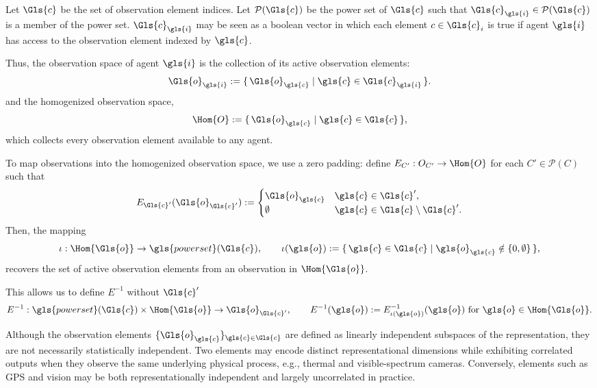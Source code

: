 Let \(\Gls{c}\) be the set of observation element indices.
Let \(\mathcal{P}(\Gls{c})\) be the power set of \(\Gls{c}\)
such that \(\Gls{c}_{\gls{i}} \in \mathcal{P}(\Gls{c})\) is a member of the power set.
\(\Gls{c}_{\gls{i}}\) may be seen as a boolean vector in which each element \(c\in \Gls{c}_i\)
is true if agent \(\gls{i}\) has access to the observation element indexed by \(\gls{c}\).

Thus, the observation space of agent \(\gls{i}\) is the collection of its active
observation elements:
\[
    \Gls{o}_{\gls{i}} := \{\, \Gls{o}_{\gls{c}} \mid \gls{c} \in \Gls{c}_{\gls{i}} \,\}.
\]
and the homogenized observation space,
\[
    \Hom{O}:= \{\, \Gls{o}_{\gls{c}} \mid \gls{c} \in \Gls{c} \,\},
\]
which collects every observation element available to any agent.

To map observations into the homogenized observation space,
we use a zero padding: define \(E_{C'} : O_{C'} \to \Hom{O}\) 
for each \(C' \in \mathcal{P}(C)\) such that
\[
    E_{\Gls{c}'}(\Gls{o}_{\Gls{c}'}) := 
    \begin{cases}
        \Gls{o}_{\gls{c}} & \gls{c} \in \Gls{c}', \\
        \emptyset & \gls{c} \in \Gls{c}\setminus \Gls{c}'.
    \end{cases}
\]
Then, the mapping
\[
    \iota : \Hom{\Gls{o}} \to \gls{powerset}(\Gls{c}), \qquad
    \iota(\gls{o}) := \{\, \gls{c} \in \Gls{c} \mid \gls{o}_{\gls{c}} \notin \{0,\emptyset\} \,\},
\]
recovers the set of active observation elements from an observation in \(\Hom{\Gls{o}}\).

This allows us to define \(E^{-1}\) without \(\Gls{c}'\)
\[
    E^{-1} : \gls{powerset}(\Gls{c}) \times \Hom{\Gls{o}} \rightarrow \Gls{o}_{\Gls{c}'}, \qquad
    E^{-1}(\gls{o}) := E^{-1}_{\iota(\gls{o})}(\gls{o}) \text{ for } \gls{o} \in \Hom{\Gls{o}}.
\]

Although the observation elements \(\{\Gls{o}_{\gls{c}}\}_{\gls{c} \in \Gls{c}}\) are 
defined as linearly independent subspaces of the representation, 
they are not necessarily statistically independent. 
Two elements may encode distinct representational dimensions while 
exhibiting correlated outputs when they observe the same underlying 
physical process, e.g., thermal and visible-spectrum cameras. 
Conversely, elements such as GPS and vision may be both 
representationally independent and largely uncorrelated in practice. 

